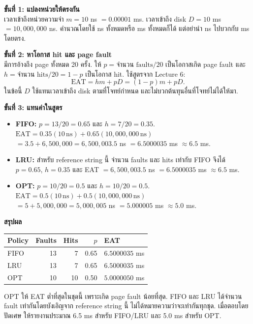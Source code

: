 \noindent\textbf{ขั้นที่ 1: แปลงหน่วยให้ตรงกัน}\\
เวลาเข้าถึงหน่วยความจำ $m=10$ ns $=0.00001$ ms. เวลาเข้าถึง disk $D=10$ ms $=10{,}000{,}000$ ns. คำนวณโดยใช้ ns ทั้งหมดหรือ ms ทั้งหมดก็ได้ แต่อย่านำ ns ไปบวกกับ ms โดยตรง.\par\medskip
\noindent\textbf{ขั้นที่ 2: หาโอกาส hit และ page fault}\\
มีการอ้างถึง page ทั้งหมด 20 ครั้ง. ให้ $p=\text{จำนวน faults}/20$ เป็นโอกาสเกิด page fault และ $h=\text{จำนวน hits}/20=1-p$ เป็นโอกาส hit. ใช้สูตรจาก Lecture 6:
\[\mathrm{EAT}=hm+pD=(1-p)m+pD.\]
\noindent ในข้อนี้ $D$ ใช้แทนเวลาเข้าถึง disk ตามที่โจทย์กำหนด และไม่บวกต้นทุนอื่นที่โจทย์ไม่ได้ให้มา.\par\medskip
\noindent\textbf{ขั้นที่ 3: แทนค่าในสูตร}
\begin{itemize}[leftmargin=1.4em,itemsep=.2cm]
\item \textbf{FIFO:} $p=13/20=0.65$ และ $h=7/20=0.35$.\\
$\mathrm{EAT}=0.35(10\,\mathrm{ns})+0.65(10{,}000{,}000\,\mathrm{ns})$\\
$=3.5+6{,}500{,}000=6{,}500{,}003.5$ ns $=6.5000035$ ms $\approx 6.5$ ms.
\item \textbf{LRU:} สำหรับ reference string นี้ จำนวน faults และ hits เท่ากับ FIFO จึงได้ $p=0.65$, $h=0.35$ และ EAT $=6{,}500{,}003.5$ ns $=6.5000035$ ms $\approx 6.5$ ms.
\item \textbf{OPT:} $p=10/20=0.5$ และ $h=10/20=0.5$.\\
$\mathrm{EAT}=0.5(10\,\mathrm{ns})+0.5(10{,}000{,}000\,\mathrm{ns})$\\
$=5+5{,}000{,}000=5{,}000{,}005$ ns $=5.000005$ ms $\approx 5.0$ ms.
\end{itemize}
\noindent\textbf{สรุปผล}
\begin{center}\renewcommand{\arraystretch}{1.2}\begin{tabular}{l|r|r|r|l}
Policy & Faults & Hits & $p$ & EAT\\\hline
FIFO & 13 & 7 & 0.65 & $6.5000035$ ms\\
LRU & 13 & 7 & 0.65 & $6.5000035$ ms\\
OPT & 10 & 10 & 0.50 & $5.0000050$ ms\\
\end{tabular}\end{center}
\noindent OPT ให้ EAT ต่ำที่สุดในชุดนี้ เพราะเกิด page fault น้อยที่สุด. FIFO และ LRU ได้จำนวน fault เท่ากันโดยบังเอิญจาก reference string นี้ ไม่ได้หมายความว่าจะเท่ากันทุกชุด. เมื่อตอบโดยปัดเศษ ให้รายงานประมาณ 6.5 ms สำหรับ FIFO/LRU และ 5.0 ms สำหรับ OPT.\par\medskip
